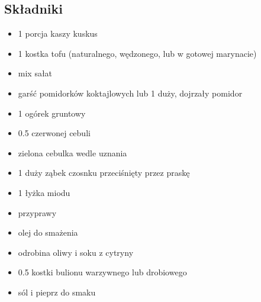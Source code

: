 \documentclass[a4paper,10pt]{book}
\begin{document}
\begin{multicols}{2}

\subsection*{Składniki}
\begin{itemize}
    \item 1 porcja kaszy kuskus
    \item 1 kostka tofu (naturalnego, wędzonego, lub w gotowej marynacie)
    \item mix sałat  
    \item garść pomidorków koktajlowych lub 1 duży, dojrzały pomidor
    \item 1 ogórek gruntowy 
    \item 0.5 czerwonej cebuli
    \item zielona cebulka wedle uznania 
    \item 1 duży ząbek czosnku przeciśnięty przez praskę 
    \item 1 łyżka miodu
    \item przyprawy
    \item olej do smażenia
    \item odrobina oliwy i soku z cytryny
    \item 0.5 kostki bulionu warzywnego lub drobiowego
    \item sól i pieprz do smaku
\end{itemize}

\columnbreak

\begin{figure}[H]
    \centering
\end{figure}
\end{multicols}
\end{document}
